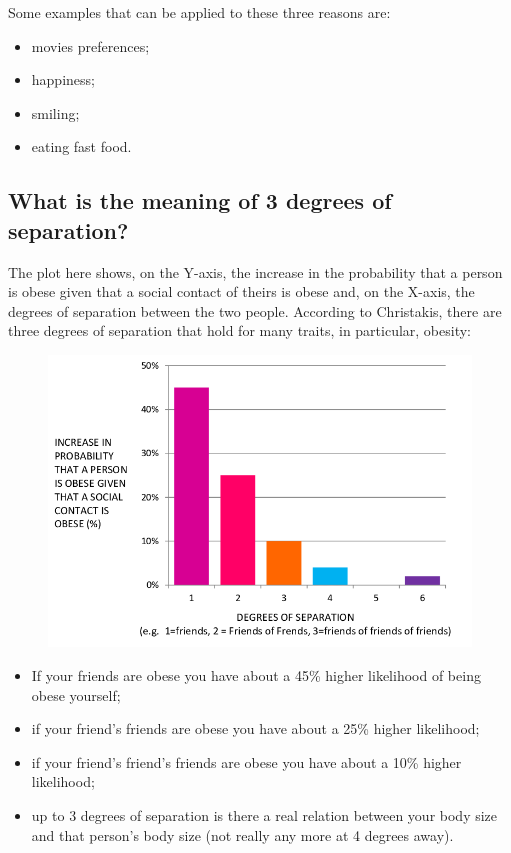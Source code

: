 \documentclass[
  notitlepage,
  onecolumn,
  openany]{book}
\providecommand{\tightlist}{%
  \setlength{\itemsep}{0pt}\setlength{\parskip}{0pt}}
\begin{document}
Some examples that can be applied to these three reasons are:

\begin{itemize}
\tightlist
\item
  movies preferences;
\item
  happiness;
\item
  smiling;
\item
  eating fast food.
\end{itemize}

\hypertarget{what-is-the-meaning-of-3-degrees-of-separation}{%
\subsection{What is the meaning of 3 degrees of separation?}\label{what-is-the-meaning-of-3-degrees-of-separation}}

The plot here shows, on the Y-axis, the increase in the probability that a person is obese given that a social contact of theirs is obese and, on the X-axis, the degrees of separation between the two people. According to Christakis, there are three degrees of separation that hold for many traits, in particular, obesity:

\begin{figure}[h!]

{\centering \includegraphics[width=0.5\linewidth]{images/14-Christakis and Valente/Untitled} 

}

\end{figure}

\begin{itemize}
\tightlist
\item
  If your friends are obese you have about a 45\% higher likelihood of being obese yourself;
\item
  if your friend's friends are obese you have about a 25\% higher likelihood;
\item
  if your friend's friend's friends are obese you have about a 10\% higher likelihood;
\item
  up to 3 degrees of separation is there a real relation between your body size and that person's body size (not really any more at 4 degrees away).
\end{itemize}
\end{document}
